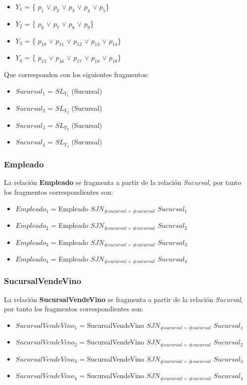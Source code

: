 \documentclass[paper=a4, fontsize=12pt]{article} %
\numberwithin{equation}{section} %
\numberwithin{figure}{section} %
\numberwithin{table}{section} %
\begin{document}
\begin{itemize}
\item $Y_{1}$ = \{ $p_{1}$ $\vee$ $p_{2}$ $\vee$ $p_{3}$ $\vee$ $p_{4}$ $\vee$ $p_{5}$\}
\item $Y_{2}$ = \{ $p_{6}$ $\vee$ $p_{7}$ $\vee$ $p_{8}$ $\vee$ $p_{9}$\}
\item $Y_{3}$ = \{ $p_{10}$ $\vee$ $p_{11}$ $\vee$ $p_{12}$ $\vee$ $p_{13}$ $\vee$ $p_{14}$\}
\item $Y_{4}$ = \{ $p_{15}$ $\vee$ $p_{16}$ $\vee$ $p_{17}$ $\vee$ $p_{18}$ $\vee$ $p_{19}$\}
\end{itemize}

Que corresponden con los siguientes fragmentos: 

\begin{itemize}
\item $Sucursal_{1}$ = $SL_{Y_{1}}$ (Sucursal)
\item $Sucursal_{2}$ = $SL_{Y_{2}}$ (Sucursal)
\item $Sucursal_{3}$ = $SL_{Y_{3}}$ (Sucursal)
\item $Sucursal_{4}$ = $SL_{Y_{4}}$ (Sucursal)
\end{itemize}

\subsubsection{Empleado}

La relación \textbf{Empleado} se fragmenta a partir de la relación \textit{Sucursal}, por tanto los fragmentos correspondientes son: \\
\begin{itemize}
\item $Empleado_{1}$ = Empleado $SJN_{\#sucursal = \#sucursal}$ $Sucursal_{1}$
\item $Empleado_{2}$ = Empleado $SJN_{\#sucursal = \#sucursal}$ $Sucursal_{2}$
\item $Empleado_{3}$ = Empleado $SJN_{\#sucursal = \#sucursal}$ $Sucursal_{3}$
\item $Empleado_{4}$ = Empleado $SJN_{\#sucursal = \#sucursal}$ $Sucursal_{4}$
\end{itemize}

\subsubsection{SucursalVendeVino}

La relación \textbf{SucursalVendeVino} se fragmenta a partir de la relación \textit{Sucursal}, por tanto los fragmentos correspondientes son: \\
\begin{itemize}
\item $SucursalVendeVino_{1}$ = SucursalVendeVino $SJN_{\#sucursal = \#sucursal}$ $Sucursal_{1}$
\item $SucursalVendeVino_{2}$ = SucursalVendeVino $SJN_{\#sucursal = \#sucursal}$ $Sucursal_{2}$
\item $SucursalVendeVino_{3}$ = SucursalVendeVino $SJN_{\#sucursal = \#sucursal}$ $Sucursal_{3}$
\item $SucursalVendeVino_{4}$ = SucursalVendeVino $SJN_{\#sucursal = \#sucursal}$ $Sucursal_{4}$
\end{itemize}
\end{document}
